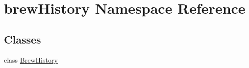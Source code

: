 \hypertarget{namespacebrew_history}{}\section{brew\+History Namespace Reference}
\label{namespacebrew_history}
\subsection*{Classes}
\begin{DoxyCompactItemize}
\item 
class \mbox{\hyperlink{classbrew_history_1_1_brew_history}{Brew\+History}}
\end{DoxyCompactItemize}
